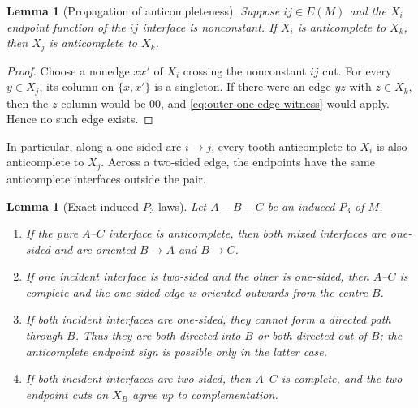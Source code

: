 \documentclass[11pt]{article}
\numberwithin{equation}{section}
\theoremstyle{plain}
\newtheorem{lemma}[theorem]{Lemma}
\theoremstyle{definition}
\begin{document}
\begin{lemma}[Propagation of anticompleteness]
\label{lem:f124-anti-propagation}
Suppose $ij\in E(M)$ and the $X_i$ endpoint function of the $ij$
interface is nonconstant.  If $X_i$ is anticomplete to $X_k$, then
$X_j$ is anticomplete to $X_k$.
\end{lemma}

\begin{proof}
Choose a nonedge $xx'$ of $X_i$ crossing the nonconstant $ij$ cut.
For every $y\in X_j$, its column on $\{x,x'\}$ is a singleton.  If
there were an edge $yz$ with $z\in X_k$, then the $z$-column would be
$00$, and \eqref{eq:outer-one-edge-witness} would apply.  Hence no such
edge exists.
\end{proof}

In particular, along a one-sided arc $i\to j$, every tooth
anticomplete to $X_i$ is also anticomplete to $X_j$.  Across a
two-sided edge, the endpoints have the same anticomplete interfaces
outside the pair.

\begin{lemma}[Exact induced-$P_3$ laws]
\label{lem:f124-outer-p3-laws}
Let $A-B-C$ be an induced $P_3$ of $M$.
\begin{enumerate}
 \item If the pure $A$--$C$ interface is anticomplete, then both mixed
       interfaces are one-sided and are oriented $B\to A$ and $B\to C$.
 \item If one incident interface is two-sided and the other is one-sided,
       then $A$--$C$ is complete and the one-sided edge is oriented
       outwards from the centre $B$.
 \item If both incident interfaces are one-sided, they cannot form a
       directed path through $B$.  Thus they are both directed into
       $B$ or both directed out of $B$; the anticomplete endpoint sign
       is possible only in the latter case.
 \item If both incident interfaces are two-sided, then $A$--$C$ is complete,
       and the two endpoint cuts on $X_B$ agree up to complementation.
\end{enumerate}
\end{lemma}
\end{document}
